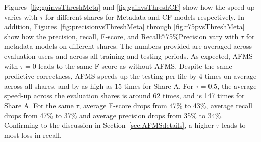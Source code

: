 {Figures~\ref{fig:gainvsThreshMeta} and \ref{fig:gainvsThreshCF} show how the speed-up varies with $\tau$ for different shares for Metadata and CF models respectively. In addition, Figures~\ref{fig:precisionvsThreshMeta} through \ref{fig:r75pvsThreshMeta} show how the precision, recall, F-score, and Recall@75\%Precision vary with $\tau$ for metadata models on different shares. The numbers provided are averaged across evaluation users and across all training and testing periods. 
As expected, AFMS with $\tau=0$ leads to the same F-score as without AFMS. Despite the same predictive correctness, AFMS speeds up the testing per file by 4 times on average across all shares, and by as high as 15 times for Share A. 
For $\tau=0.5$, the average speed-up across the evaluation shares is around 62 times, and is 147 times for Share A. For the same $\tau$, average F-score drops from 47\% to 43\%, average recall drops from 47\% to 37\% and average precision drops from 35\% to 34\%. Confirming to the discussion in Section~\ref{sec:AFMSdetails}, a higher $\tau$ leads to most loss in recall. 

}
